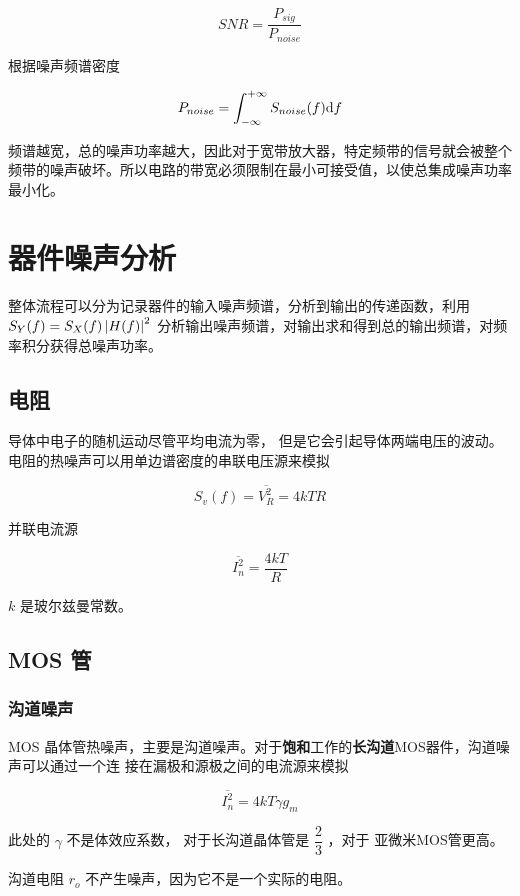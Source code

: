 \documentclass[cn,11pt,chinese,black,simple]{../elegantbook}
\begin{document}
\[SNR = \dfrac{P_{sig}}{P_{noise}}\]

根据噪声频谱密度 

\[P_{noise} = \int_{-\infty}^{+\infty} S_{noise}(f) \mathrm{d}f \]

频谱越宽，总的噪声功率越大，因此对于宽带放大器，特定频带的信号就会被整个频带的噪声破坏。所以电路的带宽必须限制在最小可接受值，以使总集成噪声功率
最小化。

\section{器件噪声分析}

整体流程可以分为记录器件的输入噪声频谱，分析到输出的传递函数，利用 \(S_Y(f) = S_X(f) \left| H(f) \right|^2\) 分析输出噪声频谱，对输出求和得到总的输出频谱，对频率积分获得总噪声功率。

\subsection{电阻}

导体中电子的随机运动尽管平均电流为零， 但是它会引起导体两端电压的波动。电阻的热噪声可以用单边谱密度的串联电压源来模拟

\[S_v(f) = \overline{V_R^2 }= 4 k T R\]

并联电流源 

\[\overline{I_n^2} = \dfrac{4 k T}{R}\]

\(k\) 是玻尔兹曼常数。



\subsection{MOS 管}

\subsubsection{沟道噪声}

MOS 晶体管热噪声，主要是沟道噪声。对于\textbf{饱和}工作的\textbf{长沟道}MOS器件，沟道噪声可以通过一个连
接在漏极和源极之间的电流源来模拟

\[\overline{I_n ^2} = 4 k T \gamma g_m \]

此处的 \(\gamma\) 不是体效应系数， 对于长沟道晶体管是 \(\dfrac{2}{3}\) ，对于
亚微米MOS管更高。


沟道电阻 \(r_o\) 不产生噪声，因为它不是一个实际的电阻。
\end{document}
